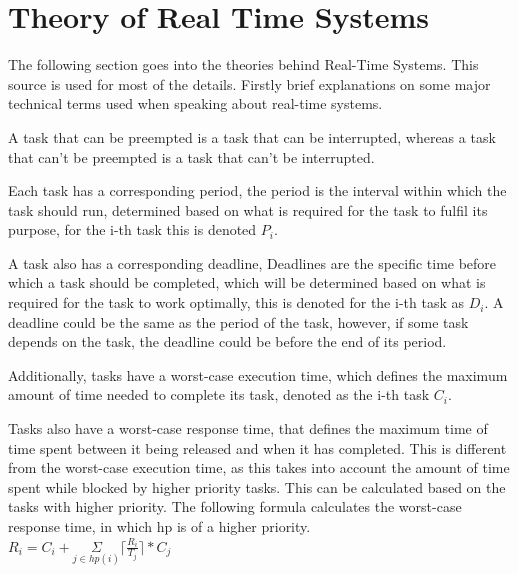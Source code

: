 \section{Theory of Real Time Systems}
The following section goes into the theories behind Real-Time Systems. This source\cite{RTSbook} is used for most of the details. Firstly brief explanations on some major technical terms used when speaking about real-time systems. %

A task that can be preempted is a task that can be interrupted, whereas a task that can't be preempted is a task that can't be interrupted.

Each task has a corresponding period, the period is the interval within which the task should run, determined based on what is required for the task to fulfil its purpose, for the i-th task this is denoted $P_{i}$.

A task also has a corresponding deadline, Deadlines are the specific time before which a task should be completed, which will be determined based on what is required for the task to work optimally, this is denoted for the i-th task as $ D_{i} $. A deadline could be the same as the period of the task, however, if some task depends on the task, the deadline could be before the end of its period. 

Additionally, tasks have a worst-case execution time, which defines the maximum amount of time needed to complete its task, denoted as the i-th task $C_{i}$.

Tasks also have a worst-case response time, that defines the maximum time of time spent between it being released and when it has completed. This is different from the worst-case execution time, as this takes into account the amount of time spent while blocked by higher priority tasks. This can be calculated based on the tasks with higher priority. The following formula calculates the worst-case response time, in which hp is of a higher priority.\\
$R_{i} = C_{i} + \underset{j\in hp(i)}{\Sigma} \lceil\frac{R_{i}}{T_{j}}\rceil*C_{j} $

